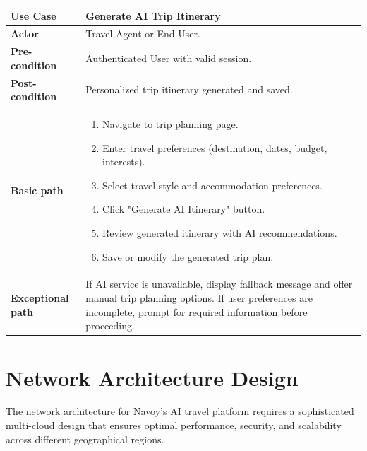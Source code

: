 \begin{longtable}{| p{} | p{} |}
    \textbf{Use Case}         & Generate AI Trip Itinerary                                                                                                                                                            \\
    \hline
    \textbf{Actor}            & Travel Agent or End User.                                                                                                                                                             \\
    \hline
    \textbf{Pre-condition}    & Authenticated User with valid session.                                                                                                                                                \\
    \hline
    \textbf{Post-condition}   & Personalized trip itinerary generated and saved.                                                                                                                                      \\
    \hline
    \textbf{Basic path}       & \begin{enumerate}
        \item Navigate to trip planning page.
        \item Enter travel preferences (destination, dates, budget, interests).
        \item Select travel style and accommodation preferences.
        \item Click "Generate AI Itinerary" button.
        \item Review generated itinerary with AI recommendations.
        \item Save or modify the generated trip plan.
    \end{enumerate}                                                                                                                                                            \\
    \hline
    \textbf{Exceptional path} & If AI service is unavailable, display fallback message and offer manual trip planning options. If user preferences are incomplete, prompt for required information before proceeding. \\
    \hline
\end{longtable}

\section{Network Architecture Design}
The network architecture for Navoy's AI travel platform requires a sophisticated multi-cloud design that ensures optimal performance, security, and scalability across different geographical regions.

